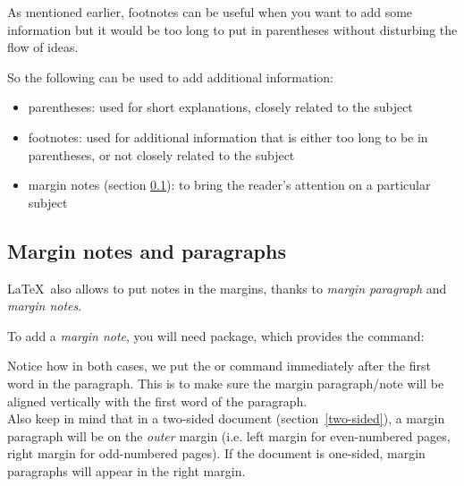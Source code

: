 As mentioned earlier, footnotes can be useful when you want to add some information but it would be too long to put in parentheses without disturbing the flow of ideas.\\

\bigskip

So the following can be used to add additional information:
\begin{itemize}
	\item parentheses: used for short explanations, closely related to the subject
	\item footnotes: used for additional information that is either too long to be in parentheses, or not closely related to the subject
	\item margin notes (section \ref{margin-notes}): to bring the reader's attention on a particular subject
\end{itemize}

\newpage


\subsection{Margin notes and paragraphs} \label{margin-notes}

\LaTeX\ also allows to put notes in the margins, thanks to \emph{margin paragraph} and \emph{margin notes}.
\\



\medskip

To add a \emph{margin note}, you will need  package, 
which provides the  command:

\medskip



\bigskip

Notice how in both cases, we put the  or  command immediately after the first word in the paragraph. This is to make sure the margin paragraph/note will be aligned vertically with the first word of the paragraph. \\

Also keep in mind that in a two-sided document (section~\ref{two-sided}), a margin paragraph will be on the \emph{outer} margin (i.e. left margin for even-numbered pages, right margin for odd-numbered pages). If the document is one-sided, margin paragraphs will appear in the right margin. \\


